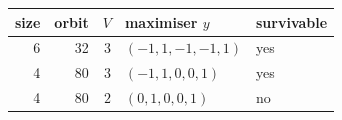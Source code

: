 \begin{tabular}{rrrll}
\toprule
size & orbit & $V$ & maximiser $y$ & survivable\\
\midrule
6 & 32 & $3$ & $(-1,1,-1,-1,1)$ & yes\\
4 & 80 & $3$ & $(-1,1,0,0,1)$ & yes\\
4 & 80 & $2$ & $(0,1,0,0,1)$ & no\\
\bottomrule
\end{tabular}
